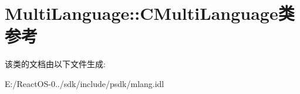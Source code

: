 \hypertarget{class_multi_language_1_1_c_multi_language}{}\section{Multi\+Language\+:\+:C\+Multi\+Language类 参考}
\label{class_multi_language_1_1_c_multi_language}


该类的文档由以下文件生成\+:\begin{DoxyCompactItemize}
\item 
E\+:/\+React\+O\+S-\/0../sdk/include/psdk/mlang.\+idl\end{DoxyCompactItemize}

